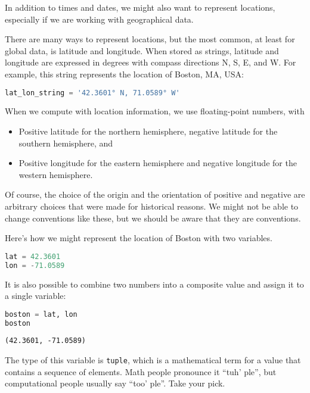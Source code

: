 In addition to times and dates, we might also want to represent
locations, especially if we are working with geographical data.

There are many ways to represent locations, but the most common, at
least for global data, is latitude and longitude. When stored as
strings, latitude and longitude are expressed in degrees with compass
directions N, S, E, and W. For example, this string represents the
location of Boston, MA, USA:

\begin{lstlisting}[language=Python,style=source]
lat_lon_string = '42.3601° N, 71.0589° W'
\end{lstlisting}

When we compute with location information, we use floating-point
numbers, with

\begin{itemize}
\item
  Positive latitude for the northern hemisphere, negative latitude for
  the southern hemisphere, and
\item
  Positive longitude for the eastern hemisphere and negative longitude
  for the western hemisphere.
\end{itemize}

Of course, the choice of the origin and the orientation of positive and
negative are arbitrary choices that were made for historical reasons. We
might not be able to change conventions like these, but we should be
aware that they are conventions.

Here's how we might represent the location of Boston with two variables.

\begin{lstlisting}[language=Python,style=source]
lat = 42.3601
lon = -71.0589
\end{lstlisting}

It is also possible to combine two numbers into a composite value and
assign it to a single variable:

\begin{lstlisting}[language=Python,style=source]
boston = lat, lon
boston
\end{lstlisting}

\begin{lstlisting}[style=output]
(42.3601, -71.0589)
\end{lstlisting}

The type of this variable is \passthrough{\lstinline!tuple!}, which is a
mathematical term for a value that contains a sequence of elements. Math
people pronounce it ``tuh' ple'', but computational people usually say
``too' ple''. Take your pick.

